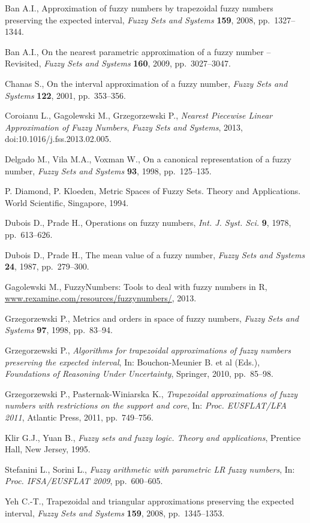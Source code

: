 \documentclass[11pt]{article}\usepackage{graphicx, color}
\newcommand{\package}[1]{\textsf{#1}\xspace}
\newcommand{\lang}[1]{\textsf{#1}\xspace}
\newcommand{\R}{\lang{R}}
\begin{document}
\begin{thebibliography}{100}
Ban A.I., Approximation of fuzzy numbers by trapezoidal fuzzy numbers
preserving the expected interval, \textit{Fuzzy Sets and Systems} \textbf{159}, 2008, pp.~1327--1344.

Ban A.I., On the nearest parametric approximation of a fuzzy
number -- Revisited, \textit{Fuzzy Sets and Systems} \textbf{160}, 2009, pp.~3027--3047.

Chanas S., On the interval approximation of a fuzzy number,
\textit{Fuzzy Sets and Systems} \textbf{122}, 2001, pp.~353--356.

Coroianu L., Gagolewski M., Grzegorzewski P.,
\textit{Nearest Piecewise Linear Approximation of Fuzzy Numbers}, 
\textit{Fuzzy Sets and Systems}, 2013, doi:10.1016/j.fss.2013.02.005.

Delgado M., Vila M.A., Voxman W., On a canonical representation of a fuzzy number,
\textit{Fuzzy Sets and Systems} \textbf{93}, 1998, pp.~125--135.

 P. Diamond, P. Kloeden, Metric Spaces of Fuzzy
Sets. Theory and Applications. World Scientific, Singapore, 1994.

Dubois D., Prade H., Operations on fuzzy numbers, \textit{Int. J. Syst. Sci.} \textbf{9}, 1978, pp.~613--626.

Dubois D., Prade H., The mean value of a fuzzy number, \textit{Fuzzy Sets and Systems} \textbf{24}, 1987, pp.~279--300.


Gagolewski M., \package{FuzzyNumbers}: Tools to deal with fuzzy numbers in \R,
\href{http://www.rexamine.com/resources/fuzzynumbers/}{www.rexamine.com/resources/fuzzynumbers/},
2013.

Grzegorzewski P., Metrics and orders in space of fuzzy numbers,
\textit{Fuzzy Sets and Systems} \textbf{97}, 1998, pp.~83--94.

Grzegorzewski P., \textit{Algorithms for trapezoidal approximations of fuzzy numbers
preserving the expected interval}, In: Bouchon-Meunier B. et al (Eds.),
\textit{Foundations of Reasoning Under Uncertainty}, Springer, 2010, pp.~85--98.

Grzegorzewski P., Pasternak-Winiarska K., \textit{Trapezoidal approximations of fuzzy numbers
with restrictions on the support and core},
In: \textit{Proc. EUSFLAT/LFA 2011}, Atlantic Press, 2011, pp.~749--756.

Klir G.J., Yuan B., \textit{Fuzzy sets and fuzzy logic. {T}heory and applications},
Prentice Hall, New Jersey, 1995.

Stefanini L., Sorini L., \textit{Fuzzy arithmetic with parametric LR fuzzy numbers},
In: \textit{Proc. IFSA/EUSFLAT 2009}, pp.~600--605.

Yeh C.-T., Trapezoidal and triangular approximations preserving the expected interval,
\textit{Fuzzy Sets and Systems} \textbf{159}, 2008, pp.~1345--1353.
\end{thebibliography}
\end{document}
